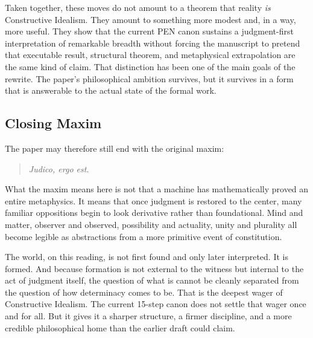 \documentclass[11pt,a4paper]{article}
\theoremstyle{plain}
\theoremstyle{definition}
\theoremstyle{remark}
\begin{document}
Taken together, these moves do not amount to a theorem that reality \emph{is} Constructive Idealism.
They amount to something more modest and, in a way, more useful.
They show that the current PEN canon sustains a judgment-first interpretation of remarkable breadth without forcing the manuscript to pretend that executable result, structural theorem, and metaphysical extrapolation are the same kind of claim.
That distinction has been one of the main goals of the rewrite.
The paper's philosophical ambition survives, but it survives in a form that is answerable to the actual state of the formal work.

\subsection{Closing Maxim}
\label{subsec:maxim}

The paper may therefore still end with the original maxim:
\begin{quote}
    \emph{Judico, ergo est.}
\end{quote}
What the maxim means here is not that a machine has mathematically proved an entire metaphysics.
It means that once judgment is restored to the center, many familiar oppositions begin to look derivative rather than foundational.
Mind and matter, observer and observed, possibility and actuality, unity and plurality all become legible as abstractions from a more primitive event of constitution.

The world, on this reading, is not first found and only later interpreted.
It is formed.
And because formation is not external to the witness but internal to the act of judgment itself, the question of what is cannot be cleanly separated from the question of how determinacy comes to be.
That is the deepest wager of Constructive Idealism.
The current 15-step canon does not settle that wager once and for all.
But it gives it a sharper structure, a firmer discipline, and a more credible philosophical home than the earlier draft could claim.
\end{document}
